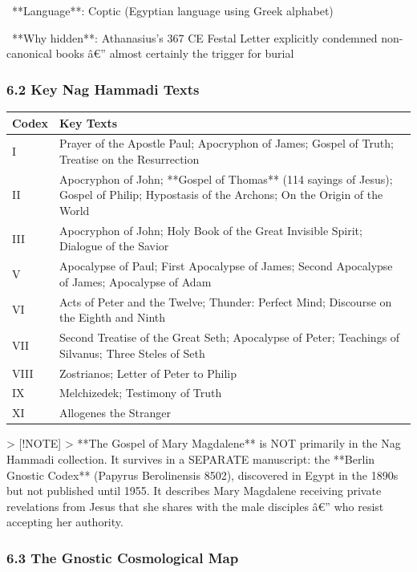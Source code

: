 \documentclass[aps,prd,11pt,onecolumn,superscriptaddress,nofootinbib,floatfix]{revtex4-2}
\begin{document}
\textbullet~**Language**: Coptic (Egyptian language using Greek alphabet)

\textbullet~**Why hidden**: Athanasius's 367 CE Festal Letter explicitly condemned non-canonical books â€'' almost certainly the trigger for burial



\subsubsection{6.2 Key Nag Hammadi Texts}


\begin{table}[h!]
\centering
\begin{tabular}{p{3cm}p{3cm}}
\hline
Codex & Key Texts \\
\hline
I & Prayer of the Apostle Paul; Apocryphon of James; Gospel of Truth; Treatise on the Resurrection \\
II & Apocryphon of John; **Gospel of Thomas** (114 sayings of Jesus); Gospel of Philip; Hypostasis of the Archons; On the Origin of the World \\
III & Apocryphon of John; Holy Book of the Great Invisible Spirit; Dialogue of the Savior \\
V & Apocalypse of Paul; First Apocalypse of James; Second Apocalypse of James; Apocalypse of Adam \\
VI & Acts of Peter and the Twelve; Thunder: Perfect Mind; Discourse on the Eighth and Ninth \\
VII & Second Treatise of the Great Seth; Apocalypse of Peter; Teachings of Silvanus; Three Steles of Seth \\
VIII & Zostrianos; Letter of Peter to Philip \\
IX & Melchizedek; Testimony of Truth \\
XI & Allogenes the Stranger \\
\hline
\end{tabular}
\end{table}



> [!NOTE]
> **The Gospel of Mary Magdalene** is NOT primarily in the Nag Hammadi collection. It survives in a SEPARATE manuscript: the **Berlin Gnostic Codex** (Papyrus Berolinensis 8502), discovered in Egypt in the 1890s but not published until 1955. It describes Mary Magdalene receiving private revelations from Jesus that she shares with the male disciples â€'' who resist accepting her authority.


\subsubsection{6.3 The Gnostic Cosmological Map}
\end{document}
